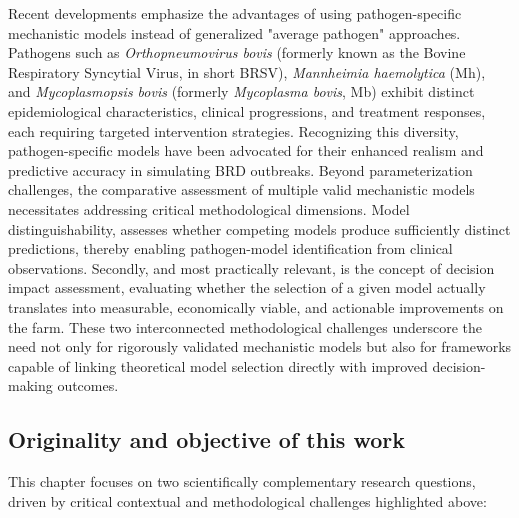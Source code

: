 Recent developments emphasize the advantages of using pathogen-specific mechanistic models instead of generalized "average pathogen" approaches. Pathogens such as \textit{Orthopneumovirus bovis} (formerly known as the Bovine Respiratory Syncytial Virus, in short BRSV), \textit{Mannheimia haemolytica} (Mh), and \textit{Mycoplasmopsis bovis} (formerly \textit{Mycoplasma bovis}, Mb) exhibit distinct epidemiological characteristics, clinical progressions, and treatment responses, each requiring targeted intervention strategies. Recognizing this diversity, pathogen-specific models have been advocated for their enhanced realism and predictive accuracy in simulating BRD outbreaks. Beyond parameterization challenges, the comparative assessment of multiple valid mechanistic models necessitates addressing critical methodological dimensions. Model distinguishability, assesses whether competing models produce sufficiently distinct predictions, thereby enabling pathogen-model identification from clinical observations. Secondly, and most practically relevant, is the concept of decision impact assessment, evaluating whether the selection of a given model actually translates into measurable, economically viable, and actionable improvements on the farm. These two interconnected methodological challenges underscore the need not only for rigorously validated mechanistic models but also for frameworks capable of linking theoretical model selection directly with improved decision-making outcomes.




\subsection{Originality and objective of this work}

This chapter focuses on two scientifically complementary research questions, driven by critical contextual and methodological challenges highlighted above:

